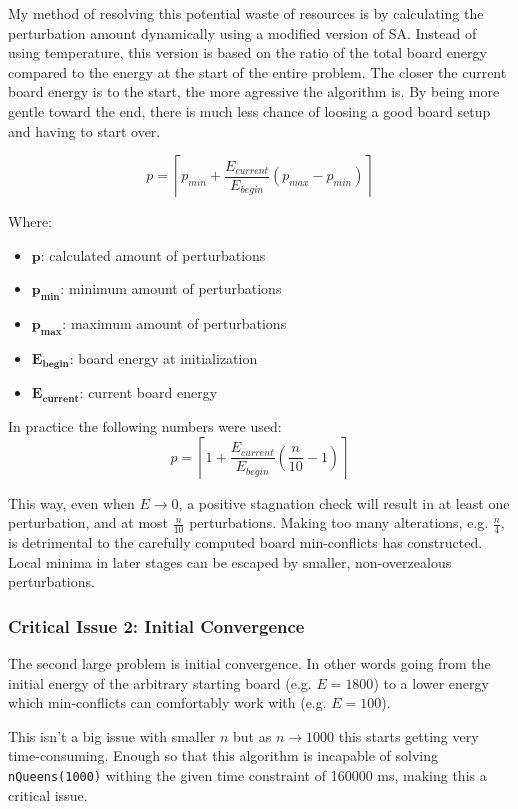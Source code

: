 \documentclass{article}
\begin{document}
My method of resolving this potential waste of resources is by calculating the perturbation amount dynamically using a modified version of SA.
Instead of using temperature,
this version is based on the ratio of the total board energy compared to the energy at the start of the entire problem. The closer the current board energy is to the start,
the more agressive the algorithm is. By being more gentle toward the end, there is much less chance of loosing a good board setup and having to start over.

\[
    p = \left\lceil p_{min}+\frac{E_{current}}{E_{begin}} \left(p_{max} - p_{min}\right)\right\rceil
\]

Where:

\begin{itemize}
    \item $\mathbf{p}$: calculated amount of perturbations
    \item $\mathbf{p_{min}}$: minimum amount of perturbations
    \item $\mathbf{p_{max}}$: maximum amount of perturbations
    \item $\mathbf{E_{begin}}$: board energy at initialization
    \item $\mathbf{E_{current}}$: current board energy
\end{itemize}

In practice the following numbers were used:
\[
    p = \left\lceil 1+\frac{E_{current}}{E_{begin}} \left(\frac{n}{10} - 1\right)\right\rceil
\]

This way, even when $E\to0$, a positive stagnation check will result in at least one perturbation, and at most $\frac{n}{10}$ perturbations.
Making too many alterations, e.g. $\frac{n}{4}$, is detrimental to the carefully computed board min-conflicts has constructed.
Local minima in later stages can be escaped by smaller, non-overzealous perturbations.

\subsubsection{Critical Issue 2: Initial Convergence}
The second large problem is initial convergence. In other words going from the initial energy of the arbitrary starting board (e.g. $E=1800$)
to a lower energy which min-conflicts can comfortably work with (e.g. $E=100$).

This isn't a big issue with smaller $n$ but as $n \to 1000$ this starts getting very time-consuming.
Enough so that this algorithm is incapable of solving \texttt{nQueens(1000)} withing the given time constraint of 160000 ms, making this a critical issue.
\end{document}
